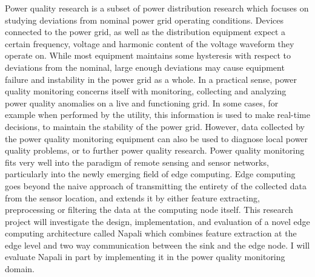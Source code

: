 Power quality research is a subset of power distribution research which focuses on studying  deviations from nominal power grid operating conditions. Devices connected to the power grid, as well as the distribution equipment expect a certain frequency, voltage and harmonic content of the voltage waveform they operate on. While most equipment maintains some hysteresis with respect to deviations from the nominal, large enough deviations may cause equipment failure and instability in the power grid as a whole. In a practical sense, power quality monitoring concerns itself with monitoring, collecting and analyzing power quality anomalies on a live and functioning grid. In some cases, for example when performed by the utility, this information is used to make real-time decisions, to maintain the stability of the power grid. However, data collected by the power quality monitoring equipment can also be used to diagnose local power quality problems, or to further power quality research. Power quality monitoring fits very well into the paradigm of remote sensing and sensor networks, particularly into the newly emerging field of edge computing. Edge computing goes beyond the naive approach of transmitting the entirety of the collected data from the sensor location, and extends it by either feature extracting, preprocessing or filtering the data at the computing node itself. This research project will investigate the design, implementation, and evaluation of a novel edge computing architecture called Napali which combines feature extraction at the edge level and two way communication between the sink and the edge node. I will evaluate Napali in part by implementing it in the power quality monitoring domain.

